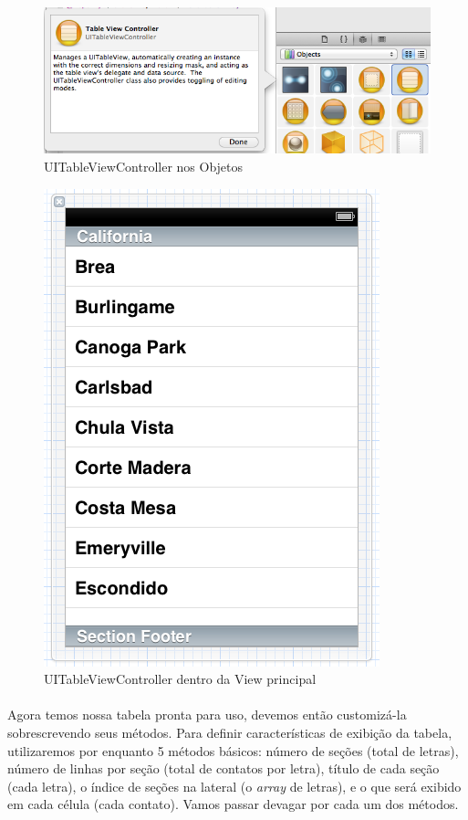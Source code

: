 \documentclass[a4paper,12pt,brazil,doubleside]{book}
\begin{document}
\begin{singlespace}
\bigskip
\bigskip

\begin{figure}[H]
  \centering
  \includegraphics[totalheight=0.2\textheight]{figuras/table/table8.png}
  \caption{UITableViewController nos Objetos}
  \label{fig:a}
\end{figure}

\bigskip

\begin{figure}[H]
  \centering
  \includegraphics[totalheight=0.5\textheight]{figuras/table/table9.png}
  \caption{UITableViewController dentro da View principal}
  \label{fig:a}
\end{figure}

\bigskip

\paragraph{}Agora temos nossa tabela pronta para uso, devemos então customizá-la sobrescrevendo seus métodos. Para definir características de exibição da tabela, utilizaremos por enquanto 5 métodos básicos: número de seções (total de letras), número de linhas por seção (total de contatos por letra), título de cada seção (cada letra), o índice de seções na lateral (o \emph{array} de letras), e o que será exibido em cada célula (cada contato). Vamos passar devagar por cada um dos métodos.

\end{singlespace}
\end{document}
